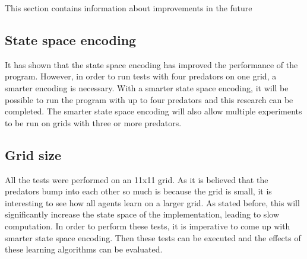This section contains information about improvements in the future

\subsection{State space encoding}
It has shown that the state space encoding has improved the performance of the program. However, in order to run tests with four predators on one grid, a smarter encoding is necessary. With a smarter state space encoding, it will be possible to run the program with up to four predators and this research can be completed. The smarter state space encoding will also allow multiple experiments to be run on grids with three or more predators. 

\subsection{Grid size}
All the tests were performed on an 11x11 grid. As it is believed that the predators bump into each other so much is because the grid is small, it is interesting to see how all agents learn on a larger grid. As stated before, this will significantly increase the state space of the implementation, leading to slow computation. In order to perform these tests, it is imperative to come up with smarter state space encoding. Then these tests can be executed and the effects of these learning algorithms can be evaluated.